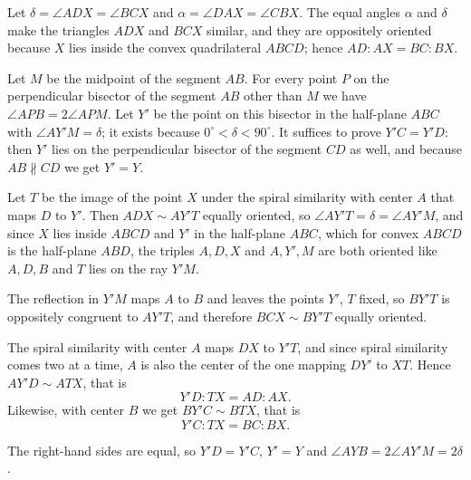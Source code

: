 {
    Let $\delta = \angle ADX = \angle BCX$ and $\alpha = \angle DAX = \angle CBX$. The equal angles $\alpha$ and $\delta$ make the triangles $ADX$ and $BCX$ similar, and they are oppositely oriented because $X$ lies inside the convex quadrilateral $ABCD$; hence $AD : AX = BC : BX$.

    Let $M$ be the midpoint of the segment $AB$. For every point $P$ on the perpendicular bisector of the segment $AB$ other than $M$ we have $\angle APB = 2\angle APM$. Let $Y'$ be the point on this bisector in the half-plane $ABC$ with $\angle AY'M = \delta$; it exists because $0^\circ < \delta < 90^\circ$. It suffices to prove $Y'C = Y'D$: then $Y'$ lies on the perpendicular bisector of the segment $CD$ as well, and because $AB \nparallel CD$ we get $Y' = Y$.

    Let $T$ be the image of the point $X$ under the spiral similarity with center $A$ that maps $D$ to $Y'$. Then $ADX \sim AY'T$ equally oriented, so $\angle AY'T = \delta = \angle AY'M$, and since $X$ lies inside $ABCD$ and $Y'$ in the half-plane $ABC$, which for convex $ABCD$ is the half-plane $ABD$, the triples $A, D, X$ and $A, Y', M$ are both oriented like $A, D, B$ and $T$ lies on the ray $Y'M$.


    The reflection in $Y'M$ maps $A$ to $B$ and leaves the points $Y'$, $T$ fixed, so $BY'T$ is oppositely congruent to $AY'T$, and therefore $BCX \sim BY'T$ equally oriented.

    The spiral similarity with center $A$ maps $DX$ to $Y'T$, and since spiral similarity comes two at a time, $A$ is also the center of the one mapping $DY'$ to $XT$. Hence $AY'D \sim ATX$, that is
    $$
    Y'D : TX = AD : AX.
    $$
    Likewise, with center $B$ we get $BY'C \sim BTX$, that is
    $$
    Y'C : TX = BC : BX.
    $$

    The right-hand sides are equal, so $Y'D = Y'C$, $Y' = Y$ and $\angle AYB = 2\angle AY'M = 2\delta$.
}

\DisplayHints

\DisplayProblemSolutions

\bye

